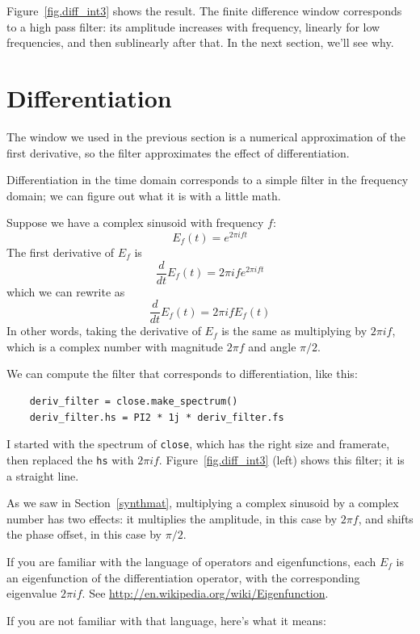 \documentclass[12pt]{book}
\begin{document}
Figure~\ref{fig.diff_int3} shows the result.  The finite difference
window corresponds to a high pass filter: its amplitude increases with
frequency, linearly for low frequencies, and then sublinearly after
that.  In the next section, we'll see why.


\section{Differentiation}
\label{effdiff}

The window we used in the previous section is a
numerical approximation of the first derivative, so the filter
approximates the effect of differentiation.

Differentiation in the time domain corresponds to a simple filter
in the frequency domain; we can figure out what it is with a little
math.

Suppose we have a complex sinusoid with frequency $f$:
%
\[ E_f(t) = e^{2 \pi i f t} \]
%
The first derivative of $E_f$ is
%
\[ \frac{d}{dt} E_f(t) = 2 \pi i f e^{2 \pi i f t} \]
%
which we can rewrite as
%
\[ \frac{d}{dt} E_f(t) = 2 \pi i f E_f(t) \]
%
In other words, taking the derivative of $E_f$ is the same
as multiplying by $2 \pi i f$, which is a complex number
with magnitude $2 \pi f$ and angle $\pi/2$.

We can compute the filter that corresponds to differentiation,
like this:

\begin{verbatim}
    deriv_filter = close.make_spectrum()
    deriv_filter.hs = PI2 * 1j * deriv_filter.fs
\end{verbatim}

I started with the spectrum of {\tt close}, which has the right
size and framerate, then replaced the {\tt hs} with $2 \pi i f$.
Figure~\ref{fig.diff_int3} (left) shows this filter; it is a straight line.

As we saw in Section~\ref{synthmat}, multiplying a complex sinusoid
by a complex number has two effects: it multiplies
the amplitude, in this case by $2 \pi f$, and shifts the phase
offset, in this case by $\pi/2$.

If you are familiar with the language of operators and eigenfunctions,
each $E_f$ is an eigenfunction of the differentiation operator, with the
corresponding eigenvalue $2 \pi i f$.  See
\url{http://en.wikipedia.org/wiki/Eigenfunction}.

If you are not familiar with that language, here's what it
means:
\end{document}
